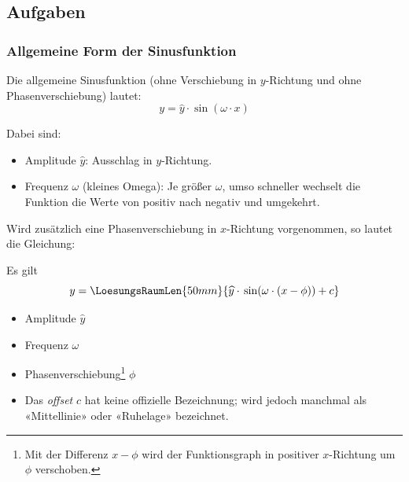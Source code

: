 

\newpage

\subsection*{Aufgaben}





\newpage

\subsubsection{Allgemeine Form der Sinusfunktion}

Die allgemeine Sinusfunktion (ohne Verschiebung in $y$-Richtung und
ohne Phasenverschiebung) lautet:
$$y=\widehat{y}\cdot{}\sin(\omega\cdot{}x)$$

Dabei sind:
\begin{itemize}

\item
  Amplitude $\widehat{y}$: Ausschlag in $y$-Richtung.
\item
  Frequenz $\omega$ (kleines Omega): Je größer $\omega$, umso schneller wechselt die
  Funktion die Werte von positiv nach negativ und umgekehrt.
\end{itemize}

Wird zusätzlich eine Phasenverschiebung in $x$-Richtung vorgenommen, so lautet die Gleichung:

\begin{gesetz}{}{}
  Es gilt
  $$y=\LoesungsRaumLen{50mm}{\widehat{y}\cdot{}\sin(\omega\cdot{}(x-\phi)) + c}$$


\begin{itemize}

\item
  Amplitude $\widehat{y}$
\item
  Frequenz $\omega$

\item
  Phasenverschiebung\footnote{Mit der Differenz $x-\phi$ wird der
  Funktionsgraph in positiver $x$-Richtung um $\phi$ verschoben.} $\phi$

\item Das \textit{offset} $c$ hat keine offizielle Bezeichnung; wird jedoch
  manchmal als «Mittellinie» oder «Ruhelage» bezeichnet.
\end{itemize}
\end{gesetz}


